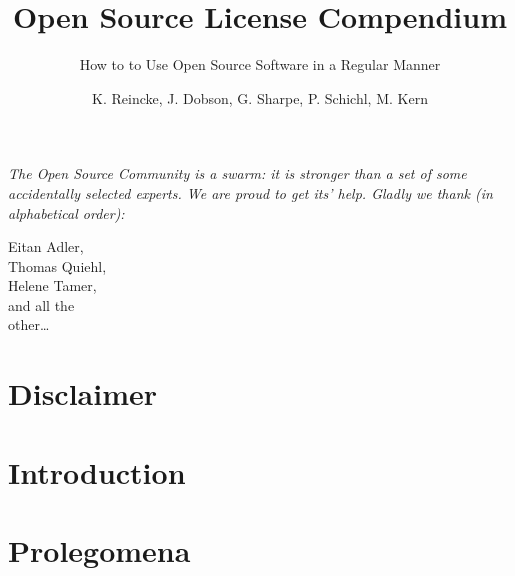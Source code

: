 \documentclass[DIV=calc,BCOR=5mm,12pt,headings=small,oneside,abstract=true,
toc=bib]{scrbook}
\begin{document}
\nocite{*}

\titlehead{Release }
\subject{\small \itshape A Practical Guide for Developers, Managers, Companies,
and OS Experts}
\title{Open Source License Compendium}
\subtitle{How to to Use Open Source Software in a Regular Manner}
\author{K. Reincke, J. Dobson, G. Sharpe, P. Schichl, 
  M. Kern}
\maketitle

\footnotesize
\begin{flushright} 

\parbox{100mm}{\itshape
The Open Source Community is a swarm: it is stronger than a set of some
accidentally selected experts. We are proud to get its' help. Gladly we thank
(in alphabetical order):
}

\parbox{50mm}{
\tiny
\begin{flushright}
Eitan Adler,\\
Thomas Quiehl,\\
Helene Tamer,\\
and all the \\
other\ldots
\end{flushright}
}
\end{flushright}
\normalsize
\newpage

\footnotesize
\tableofcontents
\newpage

\normalsize

\chapter*{Disclaimer}


\chapter{Introduction}



\chapter{Prolegomena}


%
\end{document}
